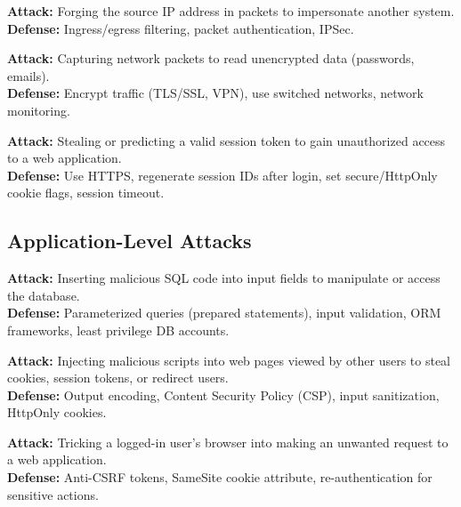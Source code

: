 \documentclass[11pt,a4paper]{article}
\begin{document}
\begin{alertbox}[IP Spoofing]
\textbf{Attack:} Forging the source IP address in packets to impersonate another system.\\
\textbf{Defense:} Ingress/egress filtering, packet authentication, IPSec.
\end{alertbox}

\begin{alertbox}
\textbf{Attack:} Capturing network packets to read unencrypted data (passwords, emails).\\
\textbf{Defense:} Encrypt traffic (TLS/SSL, VPN), use switched networks, network monitoring.
\end{alertbox}

\begin{alertbox}
\textbf{Attack:} Stealing or predicting a valid session token to gain unauthorized access to a web application.\\
\textbf{Defense:} Use HTTPS, regenerate session IDs after login, set secure/HttpOnly cookie flags, session timeout.
\end{alertbox}

\subsection{Application-Level Attacks}

\begin{alertbox}
\textbf{Attack:} Inserting malicious SQL code into input fields to manipulate or access the database.\\
\textbf{Defense:} Parameterized queries (prepared statements), input validation, ORM frameworks, least privilege DB accounts.
\end{alertbox}

\begin{alertbox}
\textbf{Attack:} Injecting malicious scripts into web pages viewed by other users to steal cookies, session tokens, or redirect users.\\
\textbf{Defense:} Output encoding, Content Security Policy (CSP), input sanitization, HttpOnly cookies.
\end{alertbox}

\begin{alertbox}
\textbf{Attack:} Tricking a logged-in user's browser into making an unwanted request to a web application.\\
\textbf{Defense:} Anti-CSRF tokens, SameSite cookie attribute, re-authentication for sensitive actions.
\end{alertbox}
\end{document}
